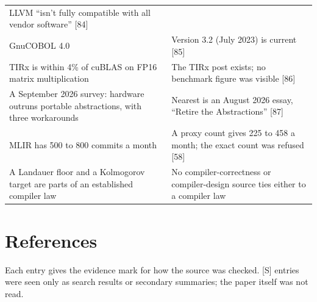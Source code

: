 \documentclass[10pt,letterpaper]{article}
\begin{document}
{\begin{longtable}[]{@{}
  >{\raggedright\arraybackslash}p{}
  >{\raggedright\arraybackslash}p{}@{}}
LLVM ``isn't fully compatible with all vendor software'' {[}84{]} \\
GnuCOBOL 4.0 & Version 3.2 (July 2023) is current {[}85{]} \\
TIRx is within 4\% of cuBLAS on FP16 matrix multiplication & The TIRx
post exists; no benchmark figure was visible {[}86{]} \\
A September 2026 survey: hardware outruns portable abstractions, with
three workarounds & Nearest is an August 2026 essay, ``Retire the
Abstractions'' {[}87{]} \\
MLIR has 500 to 800 commits a month & A proxy count gives 225 to 458 a
month; the exact count was refused {[}58{]} \\
A Landauer floor and a Kolmogorov target are parts of an established
compiler law & No compiler-correctness or compiler-design source ties
either to a compiler law \\
\end{longtable}
}

\section{References}\label{references}

Each entry gives the evidence mark for how the source was checked.
{[}S{]} entries were seen only as search results or secondary summaries;
the paper itself was not read.
\end{document}
